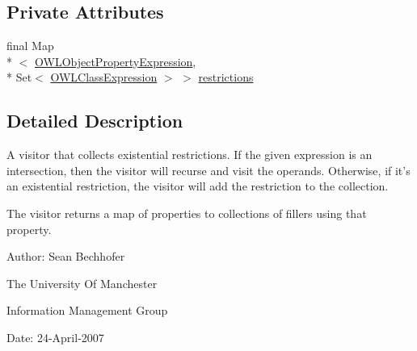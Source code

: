 \subsection*{Private Attributes}
\begin{DoxyCompactItemize}
\item 
final Map\\*
$<$ \hyperlink{interfaceorg_1_1semanticweb_1_1owlapi_1_1model_1_1_o_w_l_object_property_expression}{O\-W\-L\-Object\-Property\-Expression}, \\*
Set$<$ \hyperlink{interfaceorg_1_1semanticweb_1_1owlapi_1_1model_1_1_o_w_l_class_expression}{O\-W\-L\-Class\-Expression} $>$ $>$ \hyperlink{classuk_1_1ac_1_1manchester_1_1owl_1_1owlapi_1_1tutorial_1_1_existential_collector_a6cc3fe150efb92cb20431d1279e8f3a3}{restrictions}
\end{DoxyCompactItemize}


\subsection{Detailed Description}
A visitor that collects existential restrictions. If the given expression is an intersection, then the visitor will recurse and visit the operands. Otherwise, if it's an existential restriction, the visitor will add the restriction to the collection. 

The visitor returns a map of properties to collections of fillers using that property. 

Author\-: Sean Bechhofer\par
 The University Of Manchester\par
 Information Management Group\par
 Date\-: 24-\/\-April-\/2007\par
 \par
 


